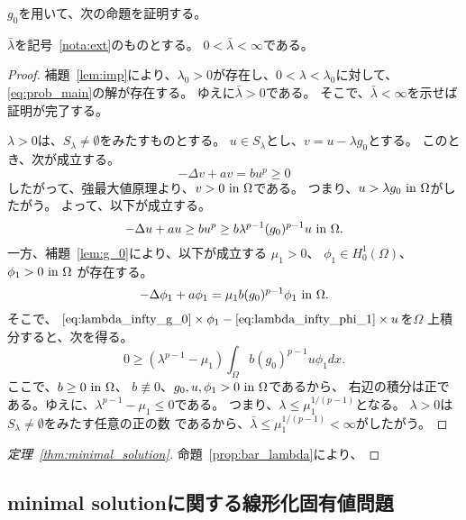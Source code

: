 $g_0$を用いて、次の命題を証明する。

\begin{prop} \label{prop:bar_lambda}
 $\bar{\lambda}$を記号~\ref{nota:ext}のものとする。
 $0 < \bar{\lambda} < \infty$である。
\end{prop}

\begin{proof}
補題~\ref{lem:imp}により、$\lambda_0 > 0$が存在し、$0 < \lambda <
 \lambda_0$に対して、\ref{eq:prob_main}の解が存在する。
ゆえに$\bar{\lambda} > 0$である。
そこで、$\bar{\lambda} < \infty$を示せば証明が完了する。

$\lambda > 0$は、$S_\lambda \neq \emptyset$をみたすものとする。
$u \in S_\lambda$とし、$v = u - \lambda g_0$とする。
このとき、次が成立する。
\[
 -\Delta v + av = bu^p \geq 0
\]
したがって、強最大値原理より、$v > 0 ~\text{in}~ \Omega$である。
つまり、$u > \lambda g_0 ~\text{in}~ \Omega$がしたがう。
よって、以下が成立する。
\begin{equation}
 - \Delta u + au \geq bu^p \geq b \lambda^{p-1} (g_0)^{p-1} u ~\text{in}~
  \Omega. \label{eq:lambda_infty_g_0} 
\end{equation}
一方、補題~\ref{lem:g_0}により、以下が成立する
$\mu_1 > 0$、
$\phi_1 \in H_0^1(\Omega)$、$\phi_1 > 0 ~\text{in}~ \Omega$
が存在する。
\begin{equation}
 -\Delta \phi_1 + a \phi_1 = \mu_1 b (g_0)^{p-1} \phi_1 ~\text{in}~ \Omega. 
  \label{eq:lambda_infty_phi_1} 
\end{equation}
 そこで、
 $\text{\eqref{eq:lambda_infty_g_0}} \times \phi_1 - 
 \text{\eqref{eq:lambda_infty_phi_1}} \times u $を$\Omega$
 上積分すると、次を得る。
 \[
  0 \geq (\lambda^{p-1} - \mu_1) \int_\Omega b(g_0)^{p-1} u \phi_1 dx.
 \]
 ここで、$b \geq 0 ~\text{in}~ \Omega$、
 $b \not \equiv 0$、$g_0, u, \phi_1 > 0 ~\text{in}~ \Omega$であるから、
 右辺の積分は正である。ゆえに、$\lambda^{p-1} - \mu_1 \leq 0$である。
 つまり、$\lambda \leq \mu_1^{1/(p-1)}$となる。
 $\lambda > 0$は$S_\lambda \neq \emptyset$をみたす任意の正の数
 であるから、$\bar{\lambda} \leq \mu_1 ^{1/(p-1)} < \infty$がしたがう。
 \qedhere
\end{proof}

\begin{proof}[定理~\ref{thm:minimal_solution}]
 命題~\ref{prop:bar_lambda}により、
\end{proof}

\subsection{minimal solutionに関する線形化固有値問題}

